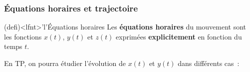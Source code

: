 \documentclass[../../main/main.tex]{subfiles}
\begin{document}
\begin{tcb*}[sidebyside, righthand ratio=.25]
\begin{center}
{		}
		\vspace{-15pt}
	\end{center}
\end{tcb*}

\subsubsection{Équations horaires et trajectoire}
\begin{tcb*}(defi)<lfnt>'l'{Équations horaires}
	Les \textbf{équations horaires} du mouvement sont les fonctions $x(t)$,
	$y(t)$ et $z(t)$ exprimées \textbf{explicitement} en fonction du temps $t$.
\end{tcb*}

En TP, on pourra étudier l'évolution de $x(t)$ et $y(t)$ dans différents cas~:
\bigbreak
\end{document}
